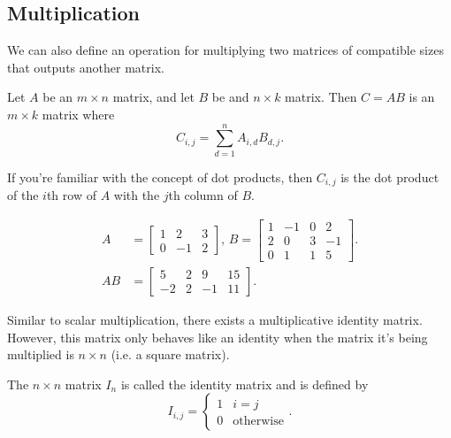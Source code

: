 \subsection{Multiplication}
We can also define an operation for multiplying two matrices of compatible sizes that outputs another matrix.

\begin{definition}
	Let $A$ be an $m \times n$ matrix, and let $B$ be and $n \times k$ matrix.
	Then $C = AB$ is an $m \times k$ matrix where
	\begin{equation*}
		C_{i,j} = \sum_{d=1}^{n}{A_{i,d} B_{d,j}}.
	\end{equation*}
\end{definition}
If you're familiar with the concept of dot products, then $C_{i,j}$ is the dot product of the $i$th row of $A$ with the $j$th column of $B$.

\begin{example}
	\begin{align*}
		A &= \begin{bmatrix}
			1 & 2 & 3 \\
			0 & -1 & 2
		\end{bmatrix} \text{, } B = \begin{bmatrix}
			1 & -1 & 0 & 2 \\
			2 & 0 & 3 & -1 \\
			0 & 1 & 1 & 5 
		\end{bmatrix}. \\
		AB &= \begin{bmatrix}
			5 & 2 & 9 & 15 \\
			-2 & 2 & -1 & 11
		\end{bmatrix}.
	\end{align*}
\end{example}

Similar to scalar multiplication, there exists a multiplicative identity matrix.
However, this matrix only behaves like an identity when the matrix it's being multiplied is $n \times n$ (i.e. a square matrix).

\begin{definition}
	The $n \times n$ matrix $I_n$ is called the identity matrix and is defined by
	\begin{equation*}
		I_{i,j} = \begin{cases}
			1 & i=j \\
			0 & \text{otherwise}
		\end{cases}.
	\end{equation*}
\end{definition}

